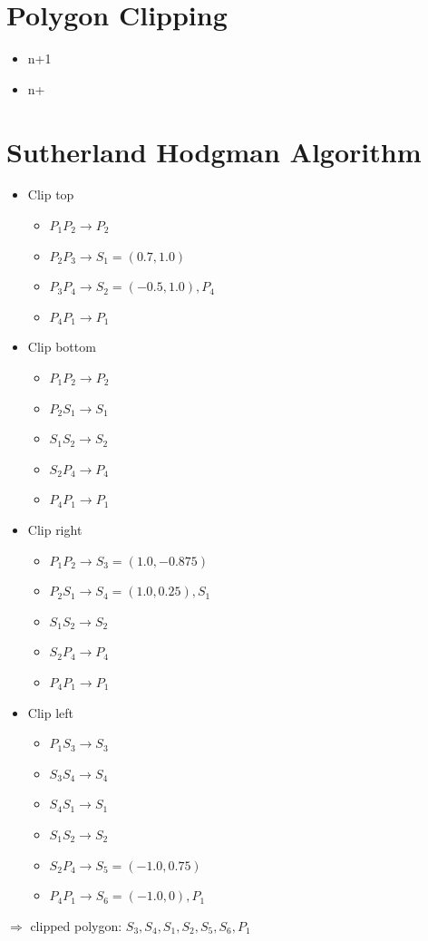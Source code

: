 \documentclass{article}
\begin{document}
\section{Polygon Clipping}
\begin{itemize}
\item n+1
\item n+
\end{itemize}

\section{Sutherland Hodgman Algorithm}
\begin{itemize}
\item Clip top
\begin{itemize}
\item $P_1P_2 \rightarrow P_2$
\item $P_2P_3 \rightarrow S_1 = (0.7,1.0)$
\item $P_3P_4 \rightarrow S_2 = (-0.5,1.0), P_4$
\item $P_4P_1 \rightarrow P_1$
\end{itemize}
\item Clip bottom
\begin{itemize}
\item $P_1P_2 \rightarrow P_2$
\item $P_2S_1 \rightarrow S_1$
\item $S_1S_2 \rightarrow S_2$
\item $S_2P_4 \rightarrow P_4$
\item $P_4P_1 \rightarrow P_1$
\end{itemize}
\item Clip right
\begin{itemize}
\item $P_1P_2 \rightarrow S_3 = (1.0,-0.875)$
\item $P_2S_1 \rightarrow S_4 = (1.0,0.25), S_1$
\item $S_1S_2 \rightarrow S_2$
\item $S_2P_4 \rightarrow P_4$
\item $P_4P_1 \rightarrow P_1$
\end{itemize}
\item Clip left
\begin{itemize}
\item $P_1S_3 \rightarrow S_3$
\item $S_3S_4 \rightarrow S_4$
\item $S_4S_1 \rightarrow S_1$
\item $S_1S_2 \rightarrow S_2$
\item $S_2P_4 \rightarrow S_5 = (-1.0,0.75)$
\item $P_4P_1 \rightarrow S_6 = (-1.0,0), P_1$
\end{itemize}
\end{itemize}
$\Rightarrow$ clipped polygon: $S_3, S_4,S_1,S_2, S_5, S_6, P_1$
\end{document}

